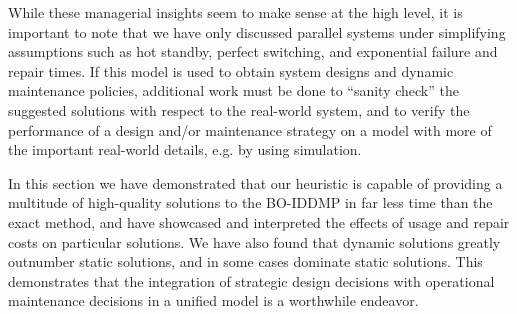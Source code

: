 \documentclass[11pt,authoryear,a4paper]{article}
\theoremstyle{definition}
\begin{document}
{%

While these managerial insights seem to make sense at the high level, it is important to note that we have only discussed parallel systems under simplifying assumptions such as hot standby, perfect switching, and exponential failure and repair times. If this model is used to obtain system designs and dynamic maintenance policies, additional work must be done to ``sanity check'' the suggested solutions with respect to the real-world system, and to verify the performance of a design and/or maintenance strategy on a model with more of the important real-world details, e.g. by using simulation.
}

In this section we have demonstrated that our heuristic is capable of providing a multitude of high-quality solutions to the BO-IDDMP in far less time than the exact method, and have showcased and interpreted the effects of usage and repair costs on particular solutions. {We have also found that dynamic solutions greatly outnumber static solutions, and in some cases dominate static solutions. This demonstrates that the integration of strategic design decisions with operational maintenance decisions in a unified model is a worthwhile endeavor.}
\end{document}
